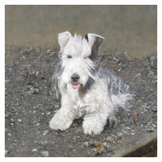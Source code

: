 \documentclass{article}
\begin{document}
\begin{figure}
\begin{subfigure}[b]{0.19\linewidth}
    \end{subfigure}
    \begin{subfigure}[b]{0.19\linewidth}
    \includegraphics[width=\linewidth]{figures/imagenet256/solver_samples/imagenet256_fm_ot_14_50.png}
    \end{subfigure}\\
    

\end{figure}
\end{document}
